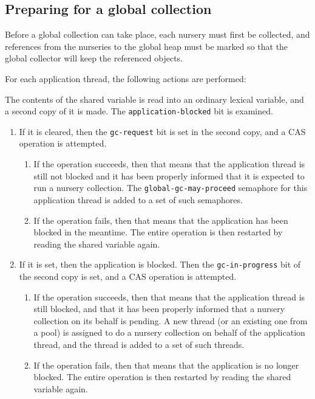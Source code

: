 \subsection{Preparing for a global collection}

Before a global collection can take place, each nursery must first be
collected, and references from the nurseries to the global heap must
be marked so that the global collector will keep the referenced
objects.

For each application thread, the following actions are performed:

The contents of the shared variable is read into an ordinary lexical
variable, and a second copy of it is made.  The
\texttt{application-blocked} bit is examined.

\begin{enumerate}
\item If it is cleared, then the \texttt{gc-request} bit is set in the
  second copy, and a CAS operation is attempted.
  \begin{enumerate}
  \item If the operation succeeds, then that means that the
    application thread is still not blocked and it has been properly
    informed that it is expected to run a nursery collection.  The
    \texttt{global-gc-may-proceed} semaphore for this application
    thread is added to a set of such semaphores.
  \item If the operation fails, then that means that the application
    has been blocked in the meantime.  The entire operation is then
    restarted by reading the shared variable again.
  \end{enumerate}
\item If it is set, then the application is blocked.  Then the
  \texttt{gc-in-progress} bit of the second copy is set, and a CAS
  operation is attempted.
  \begin{enumerate}
  \item If the operation succeeds, then that means that the
    application thread is still blocked, and that it has been properly
    informed that a nursery collection on its behalf is pending.  A
    new thread (or an existing one from a pool) is assigned to do a
    nursery collection on behalf of the application thread, and the
    thread is added to a set of such threads.
    \item If the operation fails, then that means that the application
      is no longer blocked.  The entire operation is then restarted by
      reading the shared variable again.
  \end{enumerate}
\end{enumerate}

